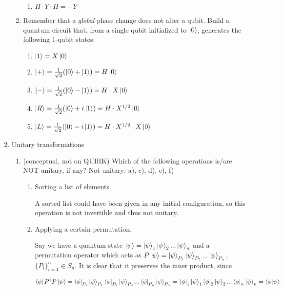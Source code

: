 \documentclass[11pt]{article}
\begin{document}
\begin{enumerate}[label*=\arabic*.]
\begin{enumerate}[label*=\arabic*.]
\begin{enumerate}[label=(\alph*)]
            \item $H\cdot Y \cdot H = -Y$
        \end{enumerate}
        \item Remember that a \textit{global} phase change does not alter a qubit. Build a quantum circuit that, from
a single qubit initialized to $\ket{0}$, generates the following 1-qubit states:\begin{enumerate}[label=(\alph*)]
            \item $\ket{1} = X\ket{0}$
            \item $\ket{+}=\frac{1}{\sqrt{2}}(\ket{0}+\ket{1}) = H \ket{0}$
            \item $\ket{-}=\frac{1}{\sqrt{2}}(\ket{0}-\ket{1}) = H\cdot X\ket{0}$
            \item $\ket{R}=\frac{1}{\sqrt{2}}(\ket{0}+i\ket{1}) = H\cdot X^{1/2}\ket{0} $
            \item $\ket{L}=\frac{1}{\sqrt{2}}(\ket{0}-i\ket{1}) = H\cdot X^{1/2}\cdot X\ket{0} $
        \end{enumerate}
    \end{enumerate}
    \item  Unitary transformations
    \begin{enumerate}[label*=\arabic*.]
        \item  (conceptual, not on QUIRK) Which of the following operations is/are NOT unitary, if any?
        Not unitary: a), c), d), e), f)
        \begin{enumerate}[label=(\alph*)]
            \item Sorting a list of elements.

            A sorted list could have been given in any initial configuration, so this operation is not invertible and thus not unitary.
            
            \item Applying a certain permutation.

            Say we have a quantum state $\ket{\psi}=\ket{\psi}_1\ket{\psi}_2...\ket{\psi}_n$ and a permutation operator which acts as $P\ket{\psi}=\ket{\psi}_{P_1}\ket{\psi}_{P_2}...\ket{\psi}_{P_n}$, $\{P_i\}_{i=1}^n\in S_n$. It is clear that it preserves the inner product, since

            $$
            \bra{\phi}P^\dagger P\ket{\psi} = \bra{\phi}_{P_1}\ket{\psi}_{P_1}\bra{\phi}_{P_2}\ket{\psi}_{P_2}...\bra{\phi}_{P_n}\ket{\psi}_{P_n} = \bra{\phi}_1\ket{\psi}_1\bra{\phi}_2\ket{\psi}_2...\bra{\phi}_n\ket{\psi}_n = \bra{\phi}\ket{\psi}
            $$


\end{enumerate}
\end{enumerate}
\end{enumerate}
\end{document}

